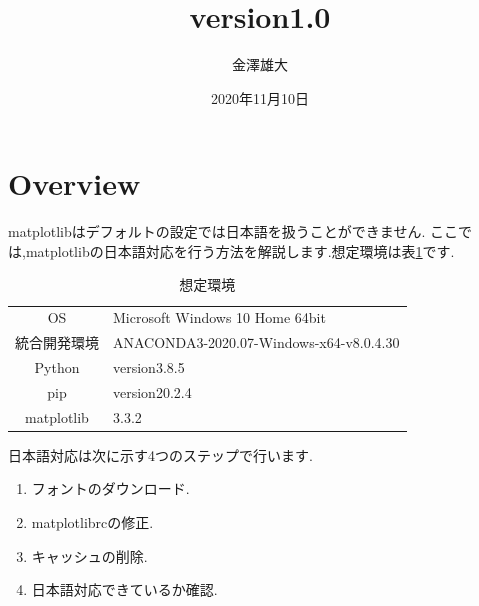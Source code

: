 \documentclass[a4j]{jarticle}
\title{version1.0}
\date{2020年11月10日}
\author{金澤雄大}
\begin{document}
    \maketitle
    \thispagestyle{empty}
    \clearpage
    \addtocounter{page}{-1}

    \section{Overview}
    matplotlibはデフォルトの設定では日本語を扱うことができません.
    ここでは,matplotlibの日本語対応を行う方法を解説します.想定環境は表\ref{env}です.
    \begin{table}[H]
      \caption{想定環境}
    \label{env}
    \begin{center}
        \begin{tabular}{c|l}\hline
          OS & Microsoft Windows 10 Home 64bit \\
          統合開発環境 & ANACONDA3-2020.07-Windows-x64-v8.0.4.30 \\
          Python & version3.8.5 \\
          pip & version20.2.4 \\
          matplotlib & 3.3.2 \\ \hline
        \end{tabular}
    \end{center}
    \end{table}


    日本語対応は次に示す4つのステップで行います.
    \begin{enumerate}
      \item フォントのダウンロード.
      \item matplotlibrcの修正.
      \item キャッシュの削除.
      \item 日本語対応できているか確認.
      \end{enumerate}
\end{document}
